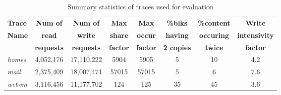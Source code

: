 \begin{table}
\caption{Summary statistics of traces used for evaluation}
\label{tab:stat-summary}
\centering
\begin{tabular}{|l|c|c|c|c|c|c|c|} \hline
	\textbf{Trace} & \textbf{Num of} & \textbf{Num of} & \textbf{Max} & \textbf{Max} & \textbf{\%blks} & \textbf{\%content} & \textbf{Write} \\
	 \textbf{Name} & \textbf{read} & \textbf{write} & \textbf{share} & \textbf{occur} & \textbf{having} & \textbf{occuring} & \textbf{intensivity} \\
			   \textbf{} & \textbf{requests} & \textbf{requests} & \textbf{factor} & \textbf{factor} & \textbf{2 copies} & \textbf{twice} & \textbf{factor}  \\ \hline
	\textit{homes} & 4,052,176 & 17,110,222 & 5904 & 5905 & 5 & 10 & 4.2 \\ \hline
	 \textit{mail} & 2,375,409 & 18,007,471 & 57015 & 57015 & 5 & 6 & 7.6 \\ \hline
	\textit{webvm} & 3,116,456 & 11,177,702 & 124 & 125 & 35 & 45 & 3.6 \\ \hline
\end{tabular}
\end{table}


